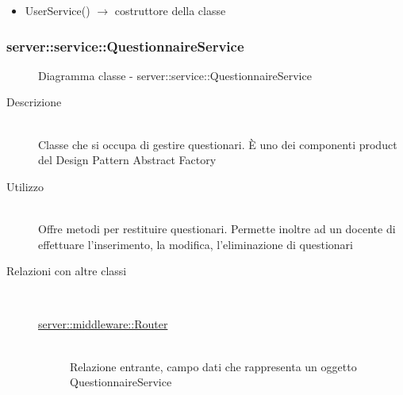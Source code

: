 \begin{description}
\begin{itemize}
	\item UserService() $\rightarrow$ costruttore della classe
\end{itemize}

\end{description}

\vspace{0.5cm}
\hypertarget{server::service::QuestionnaireService}{}
\subsubsection[QuestionnaireService]{server::service::QuestionnaireService}
\begin{figure}[H]
	\centering
	\caption{Diagramma classe - server::service::QuestionnaireService}
\end{figure}\begin{description}
\item[Descrizione] \hfill \\
Classe che si occupa di gestire questionari. È uno dei componenti product del Design Pattern Abstract Factory
\item[Utilizzo] \hfill \\
Offre metodi per restituire questionari. Permette inoltre ad un docente di effettuare l'inserimento, la modifica, l'eliminazione di questionari
\item[Relazioni con altre classi] \hfill \\
\vspace{-7mm}
\begin{description}
	\item[\hyperlink{server::middleware::Router}{server::middleware::Router}] \hfill \\
	Relazione entrante, campo dati che rappresenta un oggetto QuestionnaireService
\end{description}


\end{description}
